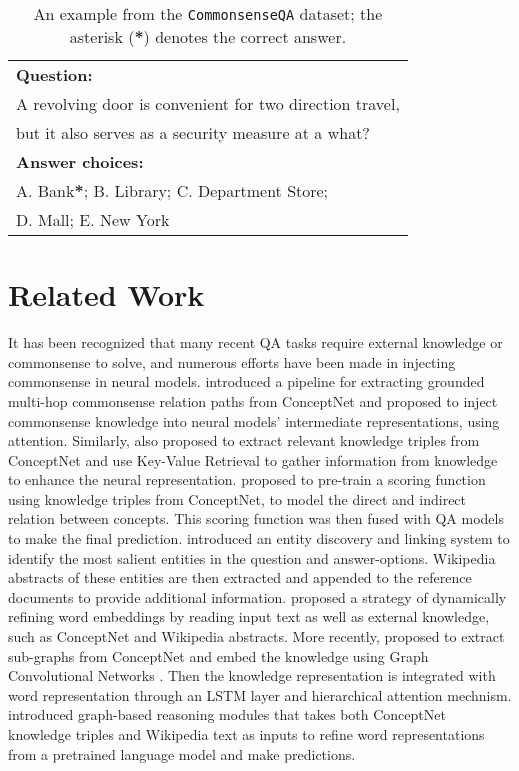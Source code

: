 \documentclass[11pt,a4paper]{article}
\begin{document}
\begin{table}[h]
\footnotesize
\begin{center}
\begin{tabular}{|l|}
\hline \bf Question: \\ 
A revolving door is convenient for two direction travel, \\
but it also serves as a security measure at a what? \\
\textbf{Answer choices:}\\ 
A. Bank\textbf{*}; B. Library; C. Department Store; \\D. Mall; E. New York \\
\hline
\end{tabular}
\end{center}
\caption{An example from the \texttt{CommonsenseQA} dataset; the asterisk (\textbf{*}) denotes the correct answer.}
\label{csqa-example}
\end{table}


\section{Related Work}
It has been recognized that many recent QA tasks require external knowledge or commonsense to solve, and numerous efforts have been made in injecting commonsense in neural models. 
\citet{bauer-etal-2018-commonsense} introduced a pipeline for extracting grounded multi-hop commonsense relation paths from ConceptNet and proposed to inject commonsense knowledge into neural models' intermediate representations, using attention.
Similarly, \citet{mihaylov-frank-2018-knowledgeable} also proposed to extract relevant knowledge triples from ConceptNet and use Key-Value Retrieval \cite{miller-etal-2016-key} to gather information from knowledge to enhance the neural representation. 
\citet{DBLP:journals/corr/abs-1809-03568} proposed to pre-train a scoring function using knowledge triples from ConceptNet, to model the direct and indirect relation between concepts. This scoring function was then fused with QA models to make the final prediction.
\citet{DBLP:journals/corr/abs-1902-00993} introduced an entity discovery and linking system to identify the most salient entities in the question and answer-options. Wikipedia abstracts of these entities are then extracted and appended to the reference documents to provide additional information.
\citet{Weissenborn2018DynamicIO} proposed a strategy of dynamically refining word embeddings by reading input text as well as external knowledge, such as ConceptNet and Wikipedia abstracts.  
More recently, \citet{Lin2019KagNetKG} proposed to extract sub-graphs from ConceptNet and embed the knowledge using Graph Convolutional Networks \cite{DBLP:journals/corr/KipfW16}. Then the knowledge representation is integrated with word representation through an LSTM layer and hierarchical attention mechnism. 
\citet{Lv2019GraphBasedRO} introduced graph-based reasoning modules that takes both ConceptNet knowledge triples and Wikipedia text as inputs to refine word representations from a pretrained language model and make predictions. 
\end{document}
